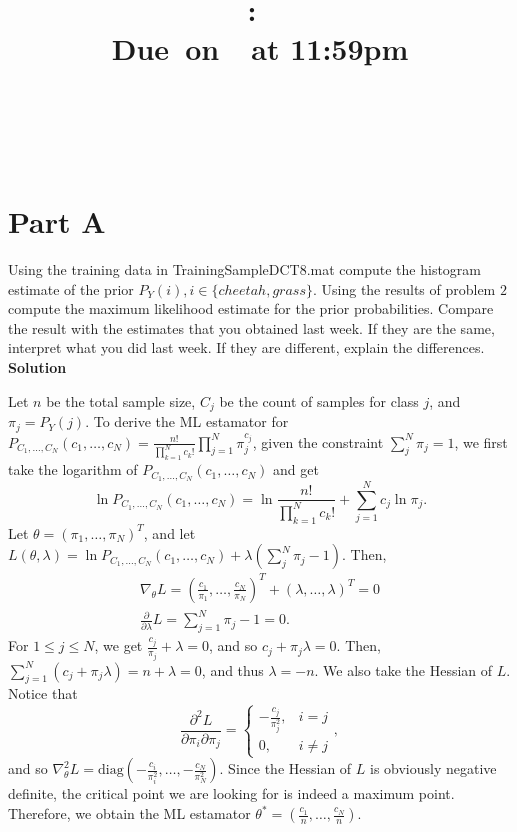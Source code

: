 \documentclass{article}
\title{
    \vspace{2in}
    \textmd{\textbf{\hmwkClass:\ \hmwkTitle}}\\
    \normalsize\vspace{0.1in}\small{Due\ on\ \hmwkDueDate\ at 11:59pm}\\
    \vspace{0.1in}\large{\textit{\hmwkClassInstructor}} \\
    \vspace{3in}
}
\author{
  \hmwkAuthorName \\
  \vspace{0.1in}\small\hmwkPID
}
\date{}
\begin{document}
\maketitle

\pagebreak

\section*{Part A}

Using the training data in {\selectfont TrainingSampleDCT\textunderscore8.mat} compute the histogram estimate of the prior $P_Y(i), i \in \{cheetah, grass\}$. Using the results of problem $2$ compute the maximum likelihood estimate for the prior probabilities. Compare the result with the estimates that you obtained last week. If they are the same, interpret what you did last week. If they are different, explain the differences. \\

\textbf{\large Solution}

Let $n$ be the total sample size, $C_j$ be the count of samples for class $j$, and $\pi_j = P_Y(j)$. To derive the ML estamator for $P_{C_1,\dots,C_N}(c_1,\dots,c_N) = \frac{n!}{\prod_{k = 1}^N c_k!}\prod^N_{j = 1}\pi^{c_j}_j$, given the constraint $\sum^N_j \pi_j = 1$, we first take the logarithm of $P_{C_1,\dots,C_N}(c_1,\dots,c_N)$ and get
\[
  \ln P_{C_1,\dots,C_N}(c_1,\dots,c_N) = \ln \frac{n!}{\prod_{k = 1}^N c_k!} + \sum^N_{j = 1} c_j \ln \pi_j.
\]
Let $\theta = (\pi_1, \dots, \pi_N)^T$, and let $L(\theta, \lambda) = \ln P_{C_1,\dots,C_N}(c_1,\dots,c_N) + \lambda\left(\sum^N_j \pi_j - 1\right)$. Then,
\begin{gather*}
  \nabla_{\theta}L = \left(\frac{c_1}{\pi_1},\dots, \frac{c_N}{\pi_N}\right)^T + (\lambda, \dots, \lambda)^T = 0 \\
  \frac{\partial}{\partial \lambda}L = \sum_{j = 1}^N \pi_j - 1 = 0.
\end{gather*}
For $1 \leq j \leq N$, we get $\frac{c_j}{\pi_j} + \lambda = 0$, and so $c_j + \pi_j\lambda = 0$. Then, $\sum^N_{j = 1} (c_j + \pi_j\lambda) = n + \lambda = 0$, and thus $ \lambda = -n$. We also take the Hessian of $L$. Notice that 
\[
    \frac{\partial^2 L}{\partial \pi_i \partial \pi_j} = \begin{cases}
        -\frac{c_j}{\pi_j^2}, & i = j \\
        0, & i \neq j
    \end{cases},
\]
and so $\nabla^2_{\theta} L = \text{diag}\left(-\frac{c_i}{\pi_i^2}, \dots, -\frac{c_N}{\pi_N^2}\right)$. Since the Hessian of $L$ is obviously negative definite, the critical point we are looking for is indeed a maximum point. Therefore, we obtain the ML estamator $\theta^* = \left(\frac{c_1}{n},\dots, \frac{c_N}{n}\right)$.
\end{document}

